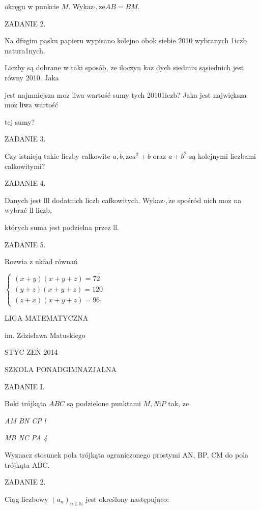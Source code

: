 \documentclass[a4paper,12pt]{article}
\begin{document}
okręgu w punkcie $M$. Wykaz$\cdot, \dot{\mathrm{z}}\mathrm{e}AB=BM.$

ZADANIE 2.

Na dfugim pasku papieru wypisano kolejno obok siebie 2010 wybranych 1iczb natura1nych.

Liczby są dobrane w taki sposób, $\dot{\mathrm{z}}\mathrm{e}$ iloczyn $\mathrm{k}\mathrm{a}\dot{\mathrm{z}}$ dych siedmiu sąsiednich jest równy 2010. Jaka

jest najmniejsza $\mathrm{m}\mathrm{o}\dot{\mathrm{z}}$ liwa wartość sumy tych 20101iczb? Jaka jest największa $\mathrm{m}\mathrm{o}\dot{\mathrm{z}}$ liwa wartość

tej sumy?

ZADANIE 3.

Czy istnieją takie liczby calkowite $a, b, \dot{\mathrm{z}}\mathrm{e}a^{2}+b$ oraz $a+b^{2}$ są kolejnymi liczbami calkowitymi?

ZADANIE 4.

Danych jest lll dodatnich liczb cafkowitych. Wykaz$\cdot, \dot{\mathrm{z}}\mathrm{e}$ spośród nich $\mathrm{m}\mathrm{o}\dot{\mathrm{z}}$ na wybrać ll liczb,

których suma jest podzielna przez ll.

ZADANIE 5.

Rozwia $\dot{\mathrm{z}}$ ukfad równań

$\left\{\begin{array}{l}
(x+y)(x+y+z)=72\\
(y+z)(x+y+z)=120\\
(z+x)(x+y+z)=96.
\end{array}\right.$






LIGA MATEMATYCZNA

im. Zdzisława Matuskiego

STYC Z$\mathrm{E}\acute{\mathrm{N}}$ 2014

SZKOLA PONADGIMNAZJALNA

ZADANIE I.

Boki trójkąta $ABC$ są podzielone punktami $M, N\mathrm{i}P$ tak, $\dot{\mathrm{z}}\mathrm{e}$

{\it AM BN CP l}

{\it MB NC PA 4}

Wyznacz stosunek pola trójkąta ograniczonego prostymi AN, BP, CM do pola trójkąta ABC.

ZADANIE 2.

Ciąg liczbowy $(a_{n})_{n\in \mathbb{N}}$ jest określony następująco:
\end{document}
